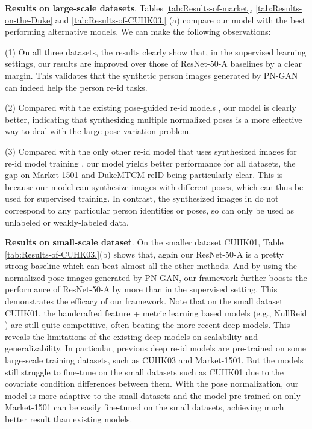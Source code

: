 \documentclass[10pt,letterpaper,twocolumn,10pt,letterpaper,twocolumn]{article}
\begin{document}
\noindent \textbf{Results on large-scale datasets}. Tables \ref{tab:Results-of-market},
\ref{tab:Results-on-the-Duke} and \ref{tab:Results-of-CUHK03.} (a)
compare our model with the best performing alternative models. We
can make the following observations:

\noindent (1) On all three datasets, the results clearly show that,
in the supervised learning settings, our results are improved over
those of ResNet-50-A baselines by a clear margin. This validates that
the synthetic person images generated by PN-GAN can indeed help the
person re-id tasks. 

\noindent \noindent (2) Compared with the existing pose-guided re-id
models \cite{zhao2017spindle,zheng2017pose,su2017pose}, our model
is clearly better, indicating that synthesizing multiple normalized
poses is a more effective way to deal with the large pose variation
problem. 

\noindent \noindent (3) Compared with the only other re-id model
that uses synthesized images for re-id model training \cite{zheng2017unlabeled},
our model yields better performance for all datasets, the gap on Market-1501
and DukeMTCM-reID being particularly clear. This is because our model
can synthesize images with different poses, which can thus be used
for supervised training. In contrast, the synthesized images in \cite{zheng2017unlabeled}
do not correspond to any particular person identities or poses, so
can only be used as unlabeled or weakly-labeled data. 

\noindent \textbf{Results on small-scale dataset}. On the smaller
dataset \textendash{} CUHK01, Table \ref{tab:Results-of-CUHK03.}(b)
shows that, again our ResNet-50-A is a pretty strong baseline which
can beat almost all the other methods. And by using the normalized
pose images generated by PN-GAN, our framework further boosts the
performance of ResNet-50-A by more than  in the supervised setting.
This demonstrates the efficacy of our framework. Note that on the
small dataset CUHK01, the handcrafted feature + metric learning based
models (e.g., NullReid \cite{NullReid}) are still
quite competitive, often beating the more recent deep models. This
reveals the limitations of the existing deep models on scalability
and generalizability. In particular, previous deep re-id models are
pre-trained on some large-scale training datasets, such as CUHK03
and Market-1501. But the models still struggle to fine-tune on the
small datasets such as CUHK01 due to the covariate condition differences
between them. With the pose normalization, our model is more adaptive
to the small datasets and the model pre-trained on only Market-1501
can be easily fine-tuned on the small datasets, achieving much better
result than existing models.
\end{document}
